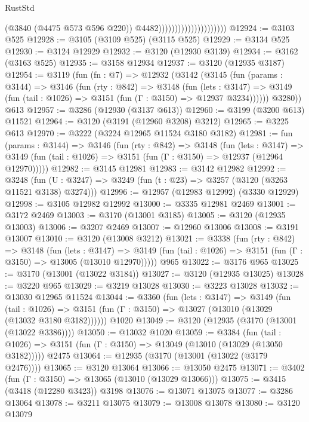 \begin{lexlean}{RustStd}
\begin{coremodule}
                                              (@3840 (@4475 @573 @596 @220))
                                              @4482)))))))))))))))))))))
@12924 := @3103 @525
@12928 := @3105 (@3109 @525) (@3115 @525)
@12929 := @3134 @525
@12930 := @3124 @12929
@12932 := @3120 (@12930 @3139)
@12934 := @3162 (@3163 @525)
@12935 := @3158 @12934
@12937 := @3120 (@12935 @3187)
@12954 := @3119
    (fun (fn : @7) =>
    @12932
      (@3142
        (@3145
          (fun (params : @3144) =>
          @3146
            (fun (rty : @842) =>
            @3148
              (fun (lets : @3147) =>
              @3149 (fun (tail : @1026) => @3151 (fun (Γ : @3150) => @12937 @3234))))))
        @3280))
    @613
@12957 := @3286 (@12930 (@3137 @613))
@12960 := @3199 (@3200 @613) @11521
@12964 := @3120 (@3191 (@12960 @3208) @3212)
@12965 := @3225 @613
@12970 := @3222 (@3224 @12965 @11524 @3180 @3182)
@12981 := fun (params : @3144) =>
  @3146
    (fun (rty : @842) =>
    @3148
      (fun (lets : @3147) =>
      @3149 (fun (tail : @1026) => @3151 (fun (Γ : @3150) => @12937 (@12964 @12970)))))
@12982 := @3145 @12981
@12983 := @3142 @12982
@12992 := @3248
    (fun (U : @3247) => @3249 (fun (t : @23) => @3257 (@3120 (@3263 @11521 @3138) @3274)))
@12996 := @12957 (@12983 @12992) (@3330 @12929)
@12998 := @3105 @12982 @12992
@13000 := @3335 @12981 @2469
@13001 := @3172 @2469
@13003 := @3170 (@13001 @3185)
@13005 := @3120 (@12935 @13003)
@13006 := @3207 @2469
@13007 := @12960 @13006
@13008 := @3191 @13007
@13010 := @3120 (@13008 @3212)
@13021 := @3338
    (fun (rty : @842) =>
    @3148
      (fun (lets : @3147) =>
      @3149 (fun (tail : @1026) => @3151 (fun (Γ : @3150) => @13005 (@13010 @12970)))))
    @965
@13022 := @3176 @965
@13025 := @3170 (@13001 (@13022 @3184))
@13027 := @3120 (@12935 @13025)
@13028 := @3220 @965
@13029 := @3219 @13028
@13030 := @3223 @13028
@13032 := @13030 @12965 @11524
@13044 := @3360
    (fun (lets : @3147) =>
    @3149
      (fun (tail : @1026) =>
      @3151 (fun (Γ : @3150) => @13027 (@13010 (@13029 (@13032 @3180 @3182))))))
    @1020
@13049 := @3120 (@12935 (@3170 (@13001 (@13022 @3386))))
@13050 := @13032 @1020
@13059 := @3384
    (fun (tail : @1026) => @3151 (fun (Γ : @3150) => @13049 (@13010 (@13029 (@13050 @3182)))))
    @2475
@13064 := @12935 (@3170 (@13001 (@13022 (@3179 @2476))))
@13065 := @3120 @13064
@13066 := @13050 @2475
@13071 := @3402 (fun (Γ : @3150) => @13065 (@13010 (@13029 @13066)))
@13075 := @3415 (@3418 (@12280 @3423)) @3198
@13076 := @13071 @13075
@13077 := @3286 @13064
@13078 := @3211 @13075
@13079 := @13008 @13078
@13080 := @3120 @13079

\end{coremodule}
\end{lexlean}
